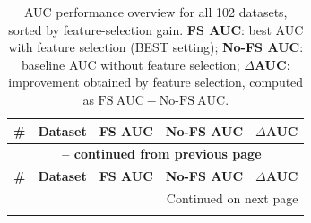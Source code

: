 \documentclass[preprint,12pt,authoryear]{elsarticle}
\begin{document}
{\footnotesize
\begin{longtable}{|c|p{4.5cm}|c|c|c|}
\caption{AUC performance overview for all 102 datasets, sorted by feature-selection gain. \textbf{FS AUC}: best AUC with feature selection (BEST setting); \textbf{No-FS AUC}: baseline AUC without feature selection; \textbf{$\Delta$AUC}: improvement obtained by feature selection, computed as $\mathrm{FS\ AUC}-\mathrm{No\text{-}FS\ AUC}$.}
\label{tab:auc_performance_all} \\
\hline
\textbf{\#} & \textbf{Dataset} & \textbf{FS AUC} & \textbf{No-FS AUC} & \textbf{$\Delta$AUC} \\
\hline
\endfirsthead
\multicolumn{5}{c}{{\bfseries \tablename\ \thetable{} -- continued from previous page}} \\
\hline
\textbf{\#} & \textbf{Dataset} & \textbf{FS AUC} & \textbf{No-FS AUC} & \textbf{$\Delta$AUC} \\
\hline
\endhead
\hline \multicolumn{5}{r}{{Continued on next page}} \\
\hline
\endfoot
\hline
\endlastfoot


\end{longtable}}
\end{document}
